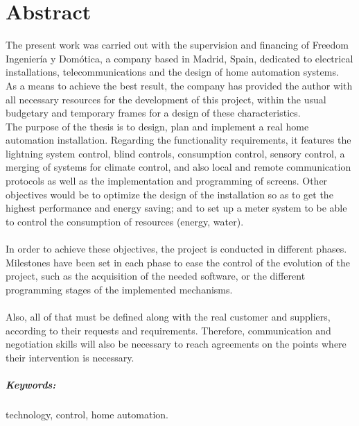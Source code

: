 \chapter{Abstract}

The present work was carried out with the supervision and financing of Freedom Ingeniería y Domótica, a company based in Madrid, Spain, dedicated to electrical installations, telecommunications and the design of home automation systems. \\
As a means to achieve the best result, the company has provided the author with all necessary resources for the development of this project, within the usual budgetary and temporary frames for a design of these characteristics.\\
The purpose of the thesis is to design, plan and implement a real home automation installation. Regarding the functionality requirements, it features the lightning system control, blind controls, consumption control, sensory control, a merging of systems for climate control, and also local and remote communication protocols as well as the implementation and programming of screens. Other objectives would be to optimize the design of the installation so as to get the highest performance and energy saving; and to set up a meter system to be able to control the consumption of resources (energy, water). \\\\
In order to achieve these objectives, the project is conducted in different phases. Milestones have been set in each phase to ease the control of the evolution of the project, such as the acquisition of the needed software, or the different programming stages of the implemented mechanisms. \\\\
Also, all of that must be defined along with the real customer and suppliers, according to their requests and requirements. Therefore, communication and negotiation skills will also be necessary to reach agreements on the points where their intervention is necessary.


\paragraph{Keywords:} technology, control, home automation.